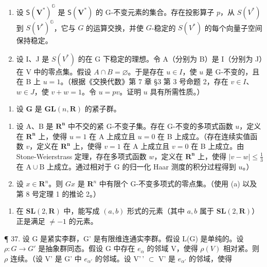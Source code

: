 \begin{enumerate}
\def\labelenumi{(\alph{enumi})}
\item
  设 \(\mathsf{S}(\mathbf{V}^{*})^{\mathbb{G}}\) 是 \(\mathsf{S}(\mathbf{V}^{*})\) 的 G-不变元素的集合。存在投影算子 \(p\)，从 \(S(V^{*})\) 到 \(S(V^{*})^{\mathbb{G}}\)，它与 \(G\) 的运算交换，并使 \(G\)-稳定的 \(S(V^{*})\) 的每个向量子空间保持稳定。
\item
  设 I、J 是 \(S(V^*)\) 的在 G 下稳定的理想。令 A（分别为 B）是 I（分别为 J）在 V 中的零点集。假设 \(A \cap B = \varnothing\)。于是存在 \(u \in I\)，使 \(u\) 是 G-不变的，且在 B 上 \(u = 1\)。（根据《交换代数》第 7 章 §3 第 3 号命题 2，存在 \(v \in I\)、\(w \in J\)，使 \(v + w = 1\)。令 \(u = pv\)。证明 \(u\) 具有所需性质。）
\end{enumerate}

\begin{enumerate}
\def\labelenumi{\arabic{enumi}.}
\setcounter{enumi}{34}
\tightlist
\item
  设 \(\mathbf{G}\) 是 \(\mathbf{GL}(n,\mathbf{R})\) 的紧子群。
\end{enumerate}

\begin{enumerate}
\def\labelenumi{(\alph{enumi})}
\item
  设 A、B 是 \(\mathbf{R}^{\mathbf{n}}\) 中不交的紧 G-不变子集。存在 G-不变的多项式函数 \(u\)，定义在 \(\mathbf{R}^{\mathbf{n}}\) 上，使得 \(u = 1\) 在 \(\mathrm{A}\) 上成立且 \(u = 0\) 在 B 上成立。（存在连续实值函数 \(v\)，定义在 \(\mathbf{R}^{\mathbf{n}}\) 上，使得 \(v = 1\) 在 A 上成立且 \(v = 0\) 在 B 上成立。由 Stone-Weierstrass 定理，存在多项式函数 \(w\)，定义在 \(\mathbf{R}^{\mathbf{n}}\) 上，使得 \(|v - w| \leqslant \frac{1}{3}\) 在 \(\mathrm{A} \cup \mathrm{B}\) 上成立。通过相对于 G 的归一化 Haar 测度的积分过程得到 \(u\)。）
\item
  设 \(x \in \mathbf{R}^n\)。则 \(Gx\) 是 \(\mathbf{R}^n\) 中有限个 G-不变多项式的零点集。（使用 (a) 以及第 8 号定理 1 的推论 2。）
\end{enumerate}

\begin{enumerate}
\def\labelenumi{\arabic{enumi}.}
\setcounter{enumi}{35}
\tightlist
\item
  在 \(\mathbf{SL}(2, \mathbf{R})\) 中，能写成 \((a, b)\) 形式的元素（其中 \(a, b\) 属于 \(\mathbf{SL}(2, \mathbf{R})\)）正是满足 \(\neq -1\) 的元素。
\end{enumerate}

¶ 37. 设 G 是紧实李群，G' 是有限维连通实李群。假设 L(G) 是单纯的。设 \(\rho: G \to G'\) 是抽象群同态。假设 G 中存在 \(e_{\alpha}\) 的邻域 V，使得 \(\rho(V)\) 相对紧。则 \(\rho\) 连续。（设 V' 是 G' 中 \(e_{\alpha'}\) 的邻域。设 V'\,' \(\subset\) V' 是 \(e_{\alpha'}\) 的邻域，使得

